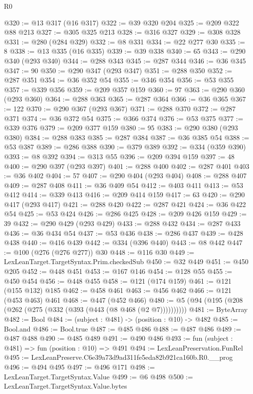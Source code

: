 \begin{lexlean}{R0}
\begin{coremodule}
@320 := @13 @317 (@16 @317)
@322 := @39 @320 @204
@325 := @209 @322 @88 @213
@327 := @305 @325 @213
@328 := @316 @327
@329 := @308 @328
@331 := @280 (@284 @329)
@332 := @8 @331
@334 := @22 @277 @30
@335 := 8
@338 := @13 @335 (@16 @335)
@339 := @39 @338
@340 := 65
@343 := @290 @340 (@293 @340)
@344 := @288 @343
@345 := @287 @344
@346 := @36 @345
@347 := 90
@350 := @290 @347 (@293 @347)
@351 := @288 @350
@352 := @287 @351
@354 := @36 @352 @54
@355 := @346 @354
@356 := @53 @355
@357 := @339 @356
@359 := @209 @357 @159
@360 := 97
@363 := @290 @360 (@293 @360)
@364 := @288 @363
@365 := @287 @364
@366 := @36 @365
@367 := 122
@370 := @290 @367 (@293 @367)
@371 := @288 @370
@372 := @287 @371
@374 := @36 @372 @54
@375 := @366 @374
@376 := @53 @375
@377 := @339 @376
@379 := @209 @377 @159
@380 := 95
@383 := @290 @380 (@293 @380)
@384 := @288 @383
@385 := @287 @384
@387 := @36 @385 @54
@388 := @53 @387
@389 := @286 @388
@390 := @379 @389
@392 := @334 (@359 @390)
@393 := @8 @392
@394 := @313 @55
@396 := @209 @394 @159
@397 := 48
@400 := @290 @397 (@293 @397)
@401 := @288 @400
@402 := @287 @401
@403 := @36 @402
@404 := 57
@407 := @290 @404 (@293 @404)
@408 := @288 @407
@409 := @287 @408
@411 := @36 @409 @54
@412 := @403 @411
@413 := @53 @412
@414 := @339 @413
@416 := @209 @414 @159
@417 := 63
@420 := @290 @417 (@293 @417)
@421 := @288 @420
@422 := @287 @421
@424 := @36 @422 @54
@425 := @53 @424
@426 := @286 @425
@428 := @209 @426 @159
@429 := 39
@432 := @290 @429 (@293 @429)
@433 := @288 @432
@434 := @287 @433
@436 := @36 @434 @54
@437 := @53 @436
@438 := @286 @437
@439 := @428 @438
@440 := @416 @439
@442 := @334 (@396 @440)
@443 := @8 @442
@447 := @100 (@276 (@276 @277)) @30
@448 := @116 @30
@449 := LexLeanTarget.TargetSyntax.Prim.checkedSub
@450 := @32 @449
@451 := @450 @205
@452 := @448 @451
@453 := @167 @146
@454 := @128 @55
@455 := @450 @454
@456 := @448 @455
@458 := @121 (@174 @159)
@461 := @121 (@155 @132) @185
@462 := @458 @461
@463 := @456 @462
@466 := @121 (@453 @463) @461
@468 := @447 (@452 @466)
@480 := @5 (@94 (@195 (@208 (@262 (@275 (@332 (@393 (@443 (@8 @468 (@2 @7))))))))))
@481 := ByteArray
@482 := Bool
@484 := (subject : @481) -> (position : @10) -> @482
@485 := Bool.and
@486 := Bool.true
@487 := @485 @486
@488 := @487 @486
@489 := @487 @488
@490 := @485 @489
@491 := @490 @486
@493 := fun (subject : @481) => fun (position : @10) => @491
@494 := LexLeanPreservation.FunRel
@495 := LexLeanPreserve.C6e39a73d9ad311fe5eda82b921ca160b.R0.__prog
@496 := @494 @495
@497 := @496 @171
@498 := LexLeanTarget.TargetSyntax.Value
@499 := @6 @498
@500 := LexLeanTarget.TargetSyntax.Value.bytes

\end{coremodule}
\end{lexlean}
